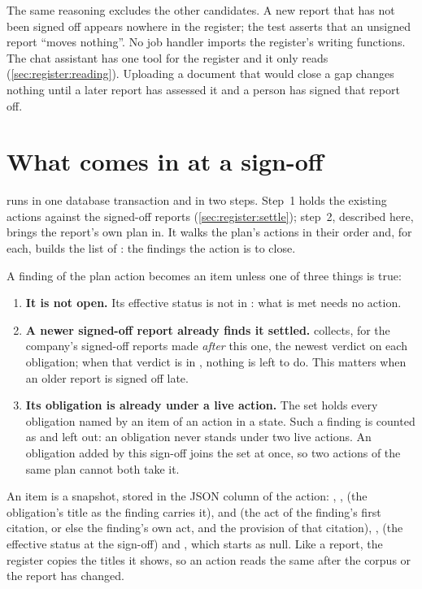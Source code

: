 The same reasoning excludes the other candidates. A new report that has not been signed off
appears nowhere in the register; the test 
asserts that an unsigned report \enquote{moves nothing}. No job handler imports the register's
writing functions. The chat assistant has one tool for the register and it only reads
(\cref{sec:register:reading}). Uploading a document that would close a gap changes nothing
until a later report has assessed it and a person has signed that report off.


\section{What comes in at a sign-off}\label{sec:register:plan}

 runs in one database transaction and in two steps. Step~1 holds
the existing actions against the signed-off reports (\cref{sec:register:settle}); step~2,
described here, brings the report's own plan in. It walks the plan's actions in their order
and, for each, builds the list of : the findings the action is to close.

A finding of the plan action becomes an item unless one of three things is true:

\begin{enumerate}
  \item \textbf{It is not open.} Its effective status is not in : what is met needs
    no action.
  \item \textbf{A newer signed-off report already finds it settled.} 
    collects, for the company's signed-off reports made \emph{after} this one, the newest
    verdict on each obligation; when that verdict is in , nothing is left to do.
    This matters when an older report is signed off late.
  \item \textbf{Its obligation is already under a live action.} The set 
    holds every obligation named by an item of an action in a  state. Such a
    finding is counted as  and left out: an obligation never stands under two
    live actions. An obligation added by this sign-off joins the set at once, so two actions
    of the same plan cannot both take it.
\end{enumerate}

An item is a snapshot, stored in the JSON column  of the action:
, ,  (the obligation's title as the finding
carries it),  and  (the act of the finding's first citation, or else the
finding's own act, and the provision of that citation), ,  (the effective status at the sign-off) and
, which starts as null. Like a report, the register copies the titles it
shows, so an action reads the same after the corpus or the report has changed.

